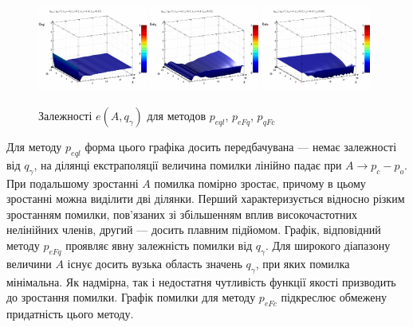 \documentclass[a4paper,13pt]{atuaref}
\begin{document}
\begin{figure}[htb!]
  \centerline{
    \includegraphics[width=0.32\textwidth]{p3/p/qls_pe-p_A_qg_eql_all.png}
    \hfill
    \includegraphics[width=0.32\textwidth]{p3/p/qls_pe-p_A_qg_eFq_all.png}
    \hfill
    \includegraphics[width=0.32\textwidth]{p3/p/qls_pe-p_A_qg_eFc_all.png}
  }
  \caption{Залежності $e(A,q_\gamma)$ для методов $p_{eql}$, $p_{eFq}$, $p_{qFc}$}
  \label{atu:f:qsl_pe_A_qg_all}
\end{figure}

Для методу $ p_{eql} $ форма цього графіка досить передбачувана --- немає
залежності від $ q_\gamma $, на ділянці екстраполяції величина помилки
лінійно падає при $ A \to p_c - p_o $. При подальшому зростанні $ A $ помилка
помірно зростає, причому в цьому зростанні можна виділити дві ділянки. Перший
характеризується відносно різким зростанням помилки, пов'язаних зі збільшенням
вплив високочастотних нелінійних членів, другий --- досить плавним підйомом.
Графік, відповідний методу $ p_{eFq} $ проявляє явну залежність помилки від
$q_\gamma$. Для широкого діапазону величини $ A $ існує досить вузька область
значень $ q_\gamma $, при яких помилка мінімальна. Як надмірна, так і
недостатня чутливість функції якості призводить до зростання помилки.
Графік помилки для методу $ p_{eFc} $ підкреслює обмежену придатність цього методу.
\end{document}
